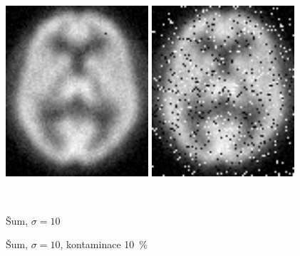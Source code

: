      \begin{figure}[h]
        \begin{minipage}[l]{0.5\textwidth}
            \center
            \includegraphics[width = 150pt]{src/8Appendix/final/10-100noise.png}
        \end{minipage}
        \begin{minipage}[r]{0.5\textwidth}
            \center
            \includegraphics[width = 150pt]{src/8Appendix/final/10-100contaminated.png}
        \end{minipage}
        \\
        \begin{minipage}[l]{0.5\textwidth}
            \caption{Šum, $\sigma = 10$}
        \end{minipage}
        \begin{minipage}[r]{0.5\textwidth}
            \caption{Šum, $\sigma = 10$, kontaminace 10~\%}
        \end{minipage}
    \end{figure}

